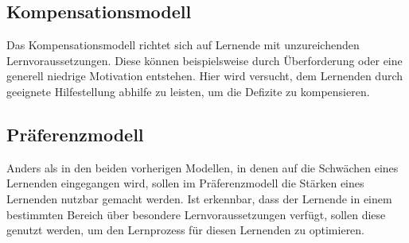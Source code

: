\subsection{Kompensationsmodell}
Das Kompensationsmodell richtet sich auf Lernende mit unzureichenden Lernvoraussetzungen.
Diese können beispielsweise durch Überforderung oder eine generell niedrige Motivation entstehen.
Hier wird versucht, dem Lernenden durch geeignete Hilfestellung abhilfe zu leisten, um die Defizite zu kompensieren.
\cite[S. 19]{lehmann2010lernstile}

\subsection{Präferenzmodell}
Anders als in den beiden vorherigen Modellen, in denen auf die Schwächen eines Lernenden eingegangen wird,
sollen im Präferenzmodell die Stärken eines Lernenden nutzbar gemacht werden. Ist erkennbar, dass
der Lernende in einem bestimmten Bereich über besondere Lernvoraussetzungen verfügt, sollen diese genutzt werden,
um den Lernprozess für diesen Lernenden zu optimieren.
\cite[S. 19]{lehmann2010lernstile}
